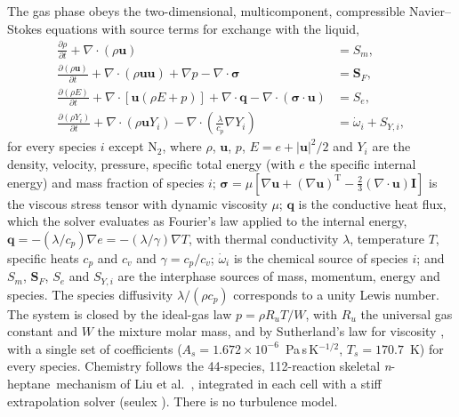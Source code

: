 \documentclass[aip,pof,preprint,amsmath,amssymb]{revtex4-2}
\newcommand{\nh}{\textit{n}-heptane}
\begin{document}
The gas phase obeys the two-dimensional, multicomponent, compressible Navier--Stokes equations with source terms for exchange with the liquid,
\begin{align}
\frac{\partial \rho}{\partial t} + \nabla\cdot(\rho\mathbf{u}) &= S_m, \\
\frac{\partial (\rho\mathbf{u})}{\partial t} + \nabla\cdot(\rho\mathbf{u}\mathbf{u}) + \nabla p - \nabla\cdot\boldsymbol{\sigma} &= \mathbf{S}_F, \\
\frac{\partial (\rho E)}{\partial t} + \nabla\cdot[\mathbf{u}(\rho E + p)] + \nabla\cdot\mathbf{q} - \nabla\cdot(\boldsymbol{\sigma}\cdot\mathbf{u}) &= S_e, \\
\frac{\partial (\rho Y_i)}{\partial t} + \nabla\cdot(\rho\mathbf{u} Y_i) - \nabla\cdot\left(\frac{\lambda}{c_p} \nabla Y_i\right) &= \dot\omega_i + S_{Y,i},
\end{align}
for every species $i$ except N$_2$, where $\rho$, $\mathbf{u}$, $p$, $E = e + |\mathbf{u}|^2/2$ and $Y_i$ are the density, velocity, pressure, specific total energy (with $e$ the specific internal energy) and mass fraction of species $i$; $\boldsymbol{\sigma} = \mu[\nabla\mathbf{u} + (\nabla\mathbf{u})^\mathrm{T} - \tfrac{2}{3}(\nabla\cdot\mathbf{u})\mathbf{I}]$ is the viscous stress tensor with dynamic viscosity $\mu$; $\mathbf{q}$ is the conductive heat flux, which the solver evaluates as Fourier's law applied to the internal energy, $\mathbf{q} = -(\lambda/c_p)\nabla e = -(\lambda/\gamma)\nabla T$, with thermal conductivity $\lambda$, temperature $T$, specific heats $c_p$ and $c_v$ and $\gamma = c_p/c_v$; $\dot\omega_i$ is the chemical source of species $i$; and $S_m$, $\mathbf{S}_F$, $S_e$ and $S_{Y,i}$ are the interphase sources of mass, momentum, energy and species. The species diffusivity $\lambda/(\rho c_p)$ corresponds to a unity Lewis number. The system is closed by the ideal-gas law $p = \rho R_u T/W$, with $R_u$ the universal gas constant and $W$ the mixture molar mass, and by Sutherland's law for viscosity \cite{Sutherland1893}, with a single set of coefficients ($A_s = 1.672 \times 10^{-6}$~Pa\,s\,K$^{-1/2}$, $T_s = 170.7$~K) for every species. Chemistry follows the 44-species, 112-reaction skeletal \nh\ mechanism of Liu et al.\ \cite{Liu2004mech}, integrated in each cell with a stiff extrapolation solver (seulex \cite{Hairer1996}). There is no turbulence model.
\end{document}
